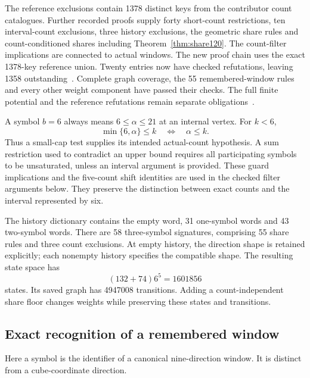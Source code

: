 \documentclass[11pt,a4paper]{article}
\theoremstyle{definition}
\theoremstyle{remark}
\begin{document}
The reference exclusions contain 1378 distinct keys from the contributor count catalogues. Further recorded proofs supply forty short-count restrictions, ten interval-count exclusions, three history exclusions, the geometric share rules and count-conditioned shares including Theorem~\ref{thm:share120}. The count-filter implications are connected to actual windows. The new proof chain uses the exact 1378-key reference union. Twenty entries now have checked refutations, leaving 1358 outstanding~\cite{pair012032archive}. Complete graph coverage, the 55 remembered-window rules and every other weight component have passed their checks. The full finite potential and the reference refutations remain separate obligations~\cite{currentarchive,interfacearchive,historycreditarchive,weightintegrationarchive,referenceunionarchive}.

A symbol $b=6$ always means $6\le\alpha\le21$ at an internal vertex. For $k<6$,
\[
\min\{6,\alpha\}\le k\quad\Longleftrightarrow\quad\alpha\le k.
\]
Thus a small-cap test supplies its intended actual-count hypothesis. A sum restriction used to contradict an upper bound requires all participating symbols to be unsaturated, unless an interval argument is provided. These guard implications and the five-count shift identities are used in the checked filter arguments below. They preserve the distinction between exact counts and the interval represented by six.

The history dictionary contains the empty word, 31 one-symbol words and 43 two-symbol words. There are 58 three-symbol signatures, comprising 55 share rules and three count exclusions. At empty history, the direction shape is retained explicitly; each nonempty history specifies the compatible shape. The resulting state space has
\[
(132+74)6^5=1601856
\]
states. Its saved graph has 4947008 transitions. Adding a count-independent share floor changes weights while preserving these states and transitions.

\subsection{Exact recognition of a remembered window}\label{sec:exact-history}
Here a symbol is the identifier of a canonical nine-direction window. It is distinct from a cube-coordinate direction.
\end{document}
